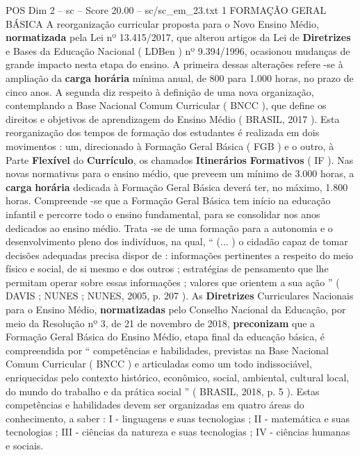 \begin{textsample}{POS Dim 2 – sc – Score 20.00 – sc/sc\_em\_23.txt}  \label{ex:f2_pos_018}
1 FORMAÇÃO GERAL BÁSICA A reorganização curricular proposta para o Novo Ensino Médio, \textbf{normatizada} pela Lei nº 13.415/2017, que alterou artigos da Lei de \textbf{Diretrizes} e Bases da Educação Nacional ( LDBen ) nº 9.394/1996, ocasionou mudanças de grande impacto nesta etapa do ensino.
A primeira dessas alterações refere -se à ampliação da \textbf{carga} \textbf{horária} mínima anual, de 800 para 1.000 horas, no prazo de cinco anos.
A segunda diz respeito à definição de uma nova organização, contemplando a Base Nacional Comum Curricular ( BNCC ), que define os direitos e objetivos de aprendizagem do Ensino Médio ( BRASIL, 2017 ).
Esta reorganização dos tempos de formação dos estudantes é realizada em dois movimentos : um, direcionado à Formação Geral Básica ( FGB ) e o outro, à Parte \textbf{Flexível} do \textbf{Currículo}, os chamados \textbf{Itinerários} \textbf{Formativos} ( IF ).
Nas novas normativas para o ensino médio, que preveem um mínimo de 3.000 horas, a \textbf{carga} \textbf{horária} dedicada à Formação Geral Básica deverá ter, no máximo, 1.800 horas.
Compreende -se que a Formação Geral Básica tem início na educação infantil e percorre todo o ensino fundamental, para se consolidar nos anos dedicados ao ensino médio.
Trata -se de uma formação para a autonomia e o desenvolvimento pleno dos indivíduos, na qual, “ (... ) o cidadão capaz de tomar decisões adequadas precisa dispor de : informações pertinentes a respeito do meio físico e social, de si mesmo e dos outros ; estratégias de pensamento que lhe permitam operar sobre essas informações ; valores que orientem a sua ação ” ( DAVIS ; NUNES ; NUNES, 2005, p. 207 ).
As \textbf{Diretrizes} Curriculares Nacionais para o Ensino Médio, \textbf{normatizadas} pelo Conselho Nacional da Educação, por meio da Resolução nº 3, de 21 de novembro de 2018, \textbf{preconizam} que a Formação Geral Básica do Ensino Médio, etapa final da educação básica, é compreendida por “ competências e habilidades, previstas na Base Nacional Comum Curricular ( BNCC ) e articuladas como um todo indissociável, enriquecidas pelo contexto histórico, econômico, social, ambiental, cultural local, do mundo do trabalho e da prática social ” ( BRASIL, 2018, p. 5 ).
Estas competências e habilidades devem ser organizadas em quatro áreas do conhecimento, a saber : I - linguagens e suas tecnologias ; II - matemática e suas tecnologias ; III - ciências da natureza e suas tecnologias ; IV - ciências humanas e sociais.

\end{textsample}
